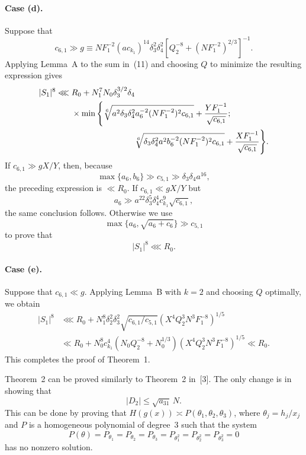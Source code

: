 \documentclass[10pt]{article}
\begin{document}
\paragraph{Case (d).}
Suppose that
\[
  c_{6,1}\gg g\equiv
  NF_1^{-2}(ac_{k_1})^{14}\delta_3^2\delta_4^2
  \left[Q_2^{-8}+(NF_1^{-2})^{2/3}\right]^{-1}.
\]
Applying Lemma~A to the sum in~(11) and choosing $Q$ to minimize the resulting expression gives
\[
\begin{aligned}
  |S_1|^8\lll{}&R_0+N_1^7N_0\delta_3^{3/2}\delta_4\\
  &\times\min\Bigg\{
    \sqrt[6]{a^2\delta_3\delta_4^2a_6^{-2}(NF_1^{-2})^2c_{6,1}}
      +\frac{YF_1^{-1}}{\sqrt{c_{6,1}}};\\
  &\hspace{27mm}
    \sqrt[6]{\delta_3\delta_4^2a^2b_6^{-2}(NF_1^{-2})^2c_{6,1}}
      +\frac{XF_1^{-1}}{\sqrt{c_{6,1}}}
  \Bigg\}.
\end{aligned}
\]
If $c_{6,1}\gg gX/Y$, then, because
\[
  \max\{a_6,b_6\}\gg c_{5,1}\gg\delta_3\delta_4a^{16},
\]
the preceding expression is $\ll R_0$. If $c_{6,1}\ll gX/Y$ but
\[
  a_6\gg a^{22}\delta_3^5\delta_4^4c_{k_1}^9\sqrt{c_{6,1}},
\]
the same conclusion follows. Otherwise we use
\[
  \max\{a_6,\sqrt{a_6+c_6}\}\gg c_{5,1}
\]
to prove that
\[
  |S_1|^8\lll R_0.
\]

\paragraph{Case (e).}
Suppose that $c_{6,1}\ll g$. Applying Lemma~B with $k=2$ and choosing $Q$ optimally, we obtain
\[
\begin{aligned}
  |S_1|^8
  &\lll R_0+N_1^8\delta_2^2\delta_3^2
    \sqrt{c_{6,1}/c_{5,1}}
    (X^4Q_2^3N^3F_1^{-8})^{1/5}\\
  &\ll R_0+N_0^8c_{k_1}^4
    (N_0Q_2^{-8}+N_0^{1/3})
    (X^4Q_2^3N^3F_1^{-8})^{1/5}
  \ll R_0.
\end{aligned}
\]
This completes the proof of Theorem~1.

Theorem~2 can be proved similarly to Theorem~2 in~[3]. The only change is in showing that
\[
  |D_2|\leqslant\sqrt{a_{31}}\,N.
\]
This can be done by proving that $H(g(x))\asymp P(\theta_1,\theta_2,\theta_3)$, where $\theta_j=h_j/x_j$ and $P$ is a homogeneous polynomial of degree~$3$ such that the system
\[
  P(\theta)=P_{\theta_1}=P_{\theta_2}=P_{\theta_3}
  =P_{\theta_1^2}=P_{\theta_2^2}=P_{\theta_3^2}=0
\]
has no nonzero solution.
\end{document}
